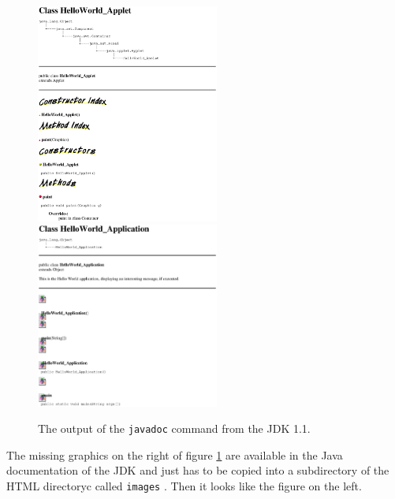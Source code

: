 \begin{figure}[htbp]
  \begin{center}
    \leavevmode
  \includegraphics[width=6cm]{Figures/HelloWorld_Applet.eps}
  \includegraphics[width=6cm]{Figures/HelloWorld_Application.eps}
    \caption{The output of the \texttt{javadoc} command from the JDK 1.1.}
    \label{fig:javadoc2}
  \end{center}
\end{figure}
The missing graphics on the right of figure \ref{fig:javadoc2} 
are available in the Java documentation of the
JDK and just has to be copied into a subdirectory  
of the HTML directoryc called \verb|images| . 
Then it looks like the figure on the left.

